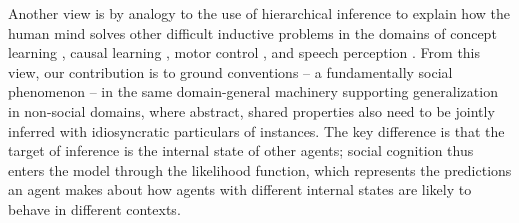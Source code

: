 Another view is by analogy to the use of hierarchical inference to explain how the human mind solves other difficult inductive problems in the domains of concept learning \cite{KempPerforsTenenbaum07_HBM, tenenbaum_how_2011}, causal learning \cite{KempGoodmanTenenbaum10_LearningToLearn,GoodmanUllmanTenenbaum11_TheoryOfCausality},  motor control \cite{berniker2008estimating}, and speech perception \cite{kleinschmidt2015robust}.
From this view, our contribution is to ground conventions -- a fundamentally social phenomenon -- in the same domain-general machinery supporting generalization in non-social domains, where abstract, shared properties also need to be jointly inferred with idiosyncratic particulars of instances.
The key difference is that the target of inference is the internal state of other agents; social cognition thus enters the model through the likelihood function, which represents the predictions an agent makes about how agents with different internal states are likely to behave in different contexts.


